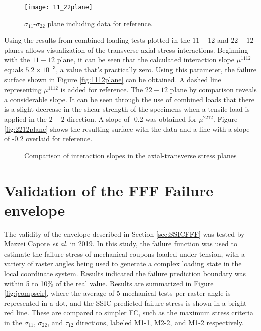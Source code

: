 \documentclass[main.tex]{subfiles}
\begin{document}
\begin{figure}[h]
	\center
	\texttt{[image: 11\_22plane]}
	\captionsetup{justification=centering} %
	\caption[failure envelope in the $\sigma_{11}$-$\sigma_{22}$ plane]{$\sigma_{11}$-$\sigma_{22}$ plane including data for reference.} \label{fig:1122plane}
\end{figure}

\pagebreak

Using the results from combined loading tests plotted in the $11-12$ and $22-12$ planes allows visualization of the transverse-axial stress interactions. Beginning with the $11-12$ plane, it can be seen that the calculated interaction slope $\mu^{1112}$ equals $5.2\times 10^{-3}$, a value that's practically zero. Using this parameter, the failure surface shown in Figure \ref{fig:1112plane} can be obtained. A dashed line representing $\mu^{1112}$ is added for reference. The $22-12$ plane by comparison reveals a considerable slope. It can be seen through the use of combined loads that there is a slight decrease in the shear strength of the specimens when a tensile load is applied in the $2-2$ direction. A slope of -0.2 was obtained for $\mu^{2212}$. Figure \ref{fig:2212plane} shows the resulting surface with the data and a line with a slope of -0.2 overlaid for reference.

\pagebreak

\begin{figure}[h]
	\center
	\linebreak
	\caption{Comparison of interaction slopes in the axial-transverse stress planes} \label{fig:SSIcomp}
\end{figure}

\section{Validation of the FFF Failure envelope}\label{sec:FFFval}

The validity of the envelope described in Section \ref{sec:SSICFFF} was tested by Mazzei Capote  \emph{et al.} \cite{MazzeiJCompSci} in 2019. In this study, the failure function was used to estimate the failure stress of mechanical coupons loaded under tension, with a variety of raster angles being used to generate a complex loading state in the local coordinate system. Results indicated the failure prediction boundary was within 5 to 10\% of the real value. Results are summarized in Figure \ref{fig:jcompscir}, where the average of 5 mechanical tests per raster angle is represented in a dot, and the SSIC predicted failure stress is shown in a bright red line. These are compared to simpler FC, such as the maximum stress criteria in the $\sigma_{11}$, $\sigma_{22}$, and $\tau_{12}$ directions, labeled M1-1, M2-2, and M1-2 respectively. 
\end{document}

